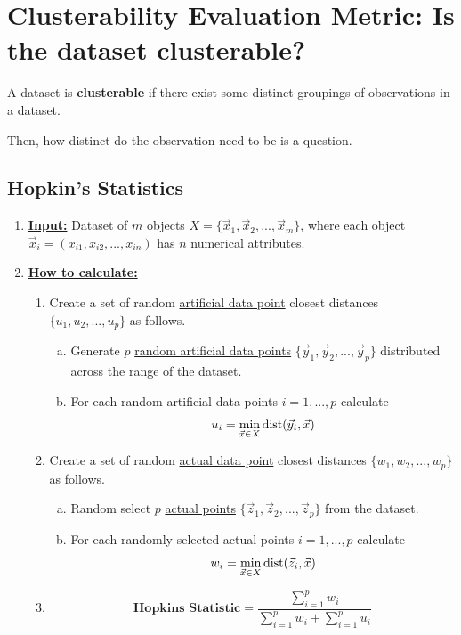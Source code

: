 \documentclass[11pt]{elegantbook}
\begin{document}
\section{Clusterability Evaluation Metric: Is the dataset clusterable?}
\begin{definition}
    A dataset is \textbf{clusterable} if there exist some distinct groupings of observations in a dataset.
\end{definition}
Then, how distinct do the observation need to be is a question.


\subsection{Hopkin's Statistics}
\begin{enumerate}[$\bullet$]
    \item \textbf{\underline{Input:}} Dataset of $m$ objects $X=\{\vec{x}_1,\vec{x}_2,...,\vec{x}_m\}$, where each object $\vec{x}_i=(x_{i1},x_{i2},...,x_{in})$ has $n$ numerical attributes.
    \item \textbf{\underline{How to calculate:}}
    \begin{enumerate}[$(1)$]
        \item Create a set of random \underline{artificial data point} closest distances $\{u_1,u_2,...,u_p\}$ as follows.
        \begin{enumerate}[a)]
            \item Generate $p$ \underline{random artificial data points} $\{\vec{y}_1, \vec{y}_2, ... , \vec{y}_p\}$ distributed across
            the range of the dataset.
            \item For each random artificial data points $i=1,...,p$ calculate $$u_i=\min_{\vec{x}\in X}\textnormal{dist}(\vec{y}_i,\vec{x})$$
        \end{enumerate}
        \item Create a set of random \underline{actual data point} closest distances $\{w_1,w_2,...,w_p\}$ as follows.
        \begin{enumerate}[a)]
            \item Random select $p$ \underline{actual points} $\{\vec{z}_1, \vec{z}_2, ... , \vec{z}_p\}$ from the dataset.
            \item For each randomly selected actual points $i=1,...,p$ calculate $$w_i=\min_{\vec{x}\in X}\textnormal{dist}(\vec{z}_i,\vec{x})$$
        \end{enumerate}
        \item $$\textbf{Hopkins Statistic}=\frac{\sum_{i=1}^p w_i}{\sum_{i=1}^p w_i+\sum_{i=1}^p u_i}$$

\end{enumerate}
\end{enumerate}
\end{document}
